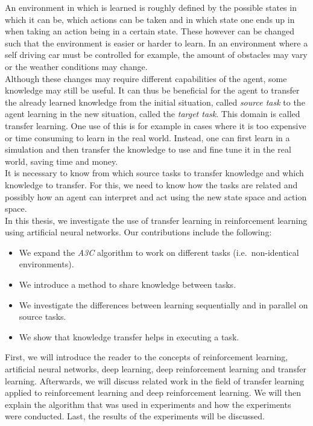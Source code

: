 An environment in which is learned is roughly defined by the possible states in which it can be, which actions can be taken and in which state one ends up in when taking an action being in a certain state.
These however can be changed such that the environment is easier or harder to learn.
In an environment where a self driving car must be controlled for example, the amount of obstacles may vary or the weather conditions may change.\\
Although these changes may require different capabilities of the agent, some knowledge may still be useful.
It can thus be beneficial for the agent to transfer the already learned knowledge from the initial situation, called \textit{source task} to the agent learning in the new situation, called the \textit{target task}.
This domain is called transfer learning. One use of this is for example in cases where it is too expensive or time consuming to learn in the real world. Instead, one can first learn in a simulation and then transfer the knowledge to use and fine tune it in the real world, saving time and money.\\
It is necessary to know from which source tasks to transfer knowledge and which knowledge to transfer.
For this, we need to know how the tasks are related and possibly how an agent can interpret and act using the new state space and action space.\\

In this thesis, we investigate the use of transfer learning in reinforcement learning using artificial neural networks. Our contributions include the following:
\begin{itemize}
    \item We expand the \textit{A3C} algorithm to work on different tasks (i.e.\ non-identical environments).
    \item We introduce a method to share knowledge between tasks.
    \item We investigate the differences between learning sequentially and in parallel on source tasks.
    \item We show that knowledge transfer helps in executing a task.
\end{itemize}
First, we will introduce the reader to the concepts of reinforcement learning, artificial neural networks, deep learning, deep reinforcement learning and transfer learning.
Afterwards, we will discuss related work in the field of transfer learning applied to reinforcement learning and deep reinforcement learning.
We will then explain the algorithm that was used in experiments and how the experiments were conducted.
Last, the results of the experiments will be discussed.
